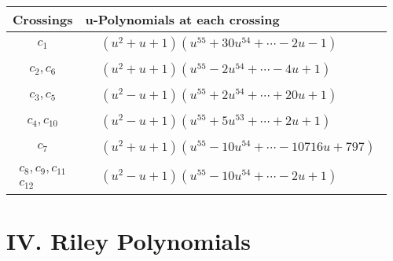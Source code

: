 \documentclass[1p]{elsarticle_modified}
\theoremstyle{definition}
\begin{document}
\begin{tabular}{m{50pt}|m{274pt}}
Crossings & \hspace{64pt}u-Polynomials at each crossing \\
\hline $$\begin{aligned}c_{1}\end{aligned}$$&$\begin{aligned}
&(u^2+u+1)(u^{55}+30 u^{54}+\cdots-2 u-1)
\end{aligned}$\\
\hline $$\begin{aligned}c_{2},c_{6}\end{aligned}$$&$\begin{aligned}
&(u^2+u+1)(u^{55}-2 u^{54}+\cdots-4 u+1)
\end{aligned}$\\
\hline $$\begin{aligned}c_{3},c_{5}\end{aligned}$$&$\begin{aligned}
&(u^2- u+1)(u^{55}+2 u^{54}+\cdots+20 u+1)
\end{aligned}$\\
\hline $$\begin{aligned}c_{4},c_{10}\end{aligned}$$&$\begin{aligned}
&(u^2- u+1)(u^{55}+5 u^{53}+\cdots+2 u+1)
\end{aligned}$\\
\hline $$\begin{aligned}c_{7}\end{aligned}$$&$\begin{aligned}
&(u^2+u+1)(u^{55}-10 u^{54}+\cdots-10716 u+797)
\end{aligned}$\\
\hline $$\begin{aligned}c_{8},c_{9},c_{11}\\c_{12}\end{aligned}$$&$\begin{aligned}
&(u^2- u+1)(u^{55}-10 u^{54}+\cdots-2 u+1)
\end{aligned}$\\
\hline
\end{tabular}\newpage\renewcommand{\arraystretch}{1}
\centering \section*{ IV. Riley Polynomials}
\end{document}
